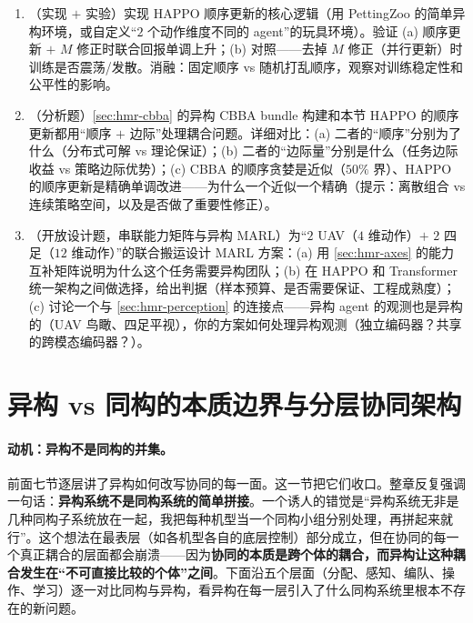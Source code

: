 \begin{practice}
\begin{enumerate}
  \item （实现 $+$ 实验）实现 HAPPO 顺序更新的核心逻辑（用 PettingZoo 的简单异构环境，或自定义“$2$ 个动作维度不同的 agent”的玩具环境）。验证 (a) 顺序更新 $+$ $M$ 修正时联合回报单调上升；(b) 对照——去掉 $M$ 修正（并行更新）时训练是否震荡/发散。消融：固定顺序 vs 随机打乱顺序，观察对训练稳定性和公平性的影响。
  \item （分析题）\cref{sec:hmr-cbba} 的异构 CBBA bundle 构建和本节 HAPPO 的顺序更新都用“顺序 $+$ 边际”处理耦合问题。详细对比：(a) 二者的“顺序”分别为了什么（分布式可解 vs 理论保证）；(b) 二者的“边际量”分别是什么（任务边际收益 vs 策略边际优势）；(c) CBBA 的顺序贪婪是近似（$50\%$ 界）、HAPPO 的顺序更新是精确单调改进——为什么一个近似一个精确（提示：离散组合 vs 连续策略空间，以及是否做了重要性修正）。
  \item （开放设计题，串联能力矩阵与异构 MARL）为“$2$ UAV（$4$ 维动作）$+$ $2$ 四足（$12$ 维动作）”的联合搬运设计 MARL 方案：(a) 用 \cref{sec:hmr-axes} 的能力互补矩阵说明为什么这个任务需要异构团队；(b) 在 HAPPO 和 Transformer 统一架构之间做选择，给出判据（样本预算、是否需要保证、工程成熟度）；(c) 讨论一个与 \cref{sec:hmr-perception} 的连接点——异构 agent 的观测也是异构的（UAV 鸟瞰、四足平视），你的方案如何处理异构观测（独立编码器？共享的跨模态编码器？）。
\end{enumerate}
\end{practice}

\section{异构 vs 同构的本质边界与分层协同架构}
\label{sec:hmr-bound}

\paragraph{动机：异构不是同构的并集。}
前面七节逐层讲了异构如何改写协同的每一面。这一节把它们收口。整章反复强调一句话：\textbf{异构系统不是同构系统的简单拼接}。一个诱人的错觉是“异构系统无非是几种同构子系统放在一起，我把每种机型当一个同构小组分别处理，再拼起来就行”。这个想法在最表层（如各机型各自的底层控制）部分成立，但在协同的每一个真正耦合的层面都会崩溃——因为\textbf{协同的本质是跨个体的耦合，而异构让这种耦合发生在“不可直接比较的个体”之间}。下面沿五个层面（分配、感知、编队、操作、学习）逐一对比同构与异构，看异构在每一层引入了什么同构系统里根本不存在的新问题。

